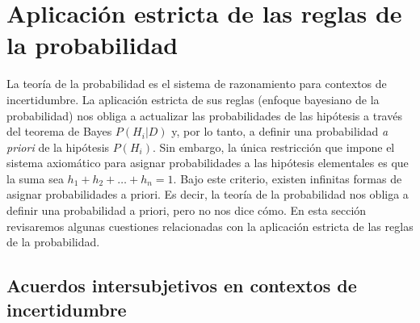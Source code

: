 \documentclass[a4paper,11pt]{book}
\theoremstyle{definition}
\begin{document}
\section{Aplicaci\'on estricta de las reglas de la probabilidad} \label{sec:aplicacion_estricta}


La teor\'ia de la probabilidad es el sistema de razonamiento para contextos de incertidumbre.
%
La aplicaci\'on estricta de sus reglas (enfoque bayesiano de la probabilidad) nos obliga a actualizar las probabilidades de las hip\'otesis a trav\'es del teorema de Bayes $P(H_i|D)$ y, por lo tanto, a definir una probabilidad \emph{a priori} de la hip\'otesis $P(H_i)$.
%
Sin embargo, la \'unica restricci\'on que impone el sistema axiom\'atico para asignar probabilidades a las hip\'otesis elementales es que la suma sea $h_1 + h_2 + \dots + h_n = 1$.
%
Bajo este criterio, existen infinitas formas de asignar probabilidades a priori.
%
Es decir, la teor\'ia de la probabilidad nos obliga a definir una probabilidad a priori, pero no nos dice c\'omo.
%
En esta sección revisaremos algunas cuestiones relacionadas con la aplicaci\'on estricta de las reglas de la probabilidad.

\subsection{Acuerdos intersubjetivos en contextos de incertidumbre} \label{sec:acuerdos_intersubjetivos}
\end{document}
